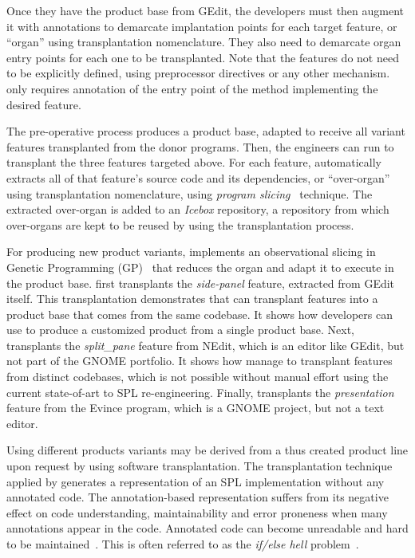 Once they have the product base from GEdit, the developers must then augment it with annotations to demarcate implantation points for each target feature, or “organ” using transplantation nomenclature. They also need to demarcate organ entry points for each one to be transplanted. Note that the features do not need to be explicitly defined, using preprocessor directives or any other mechanism. \autoscalpel only requires annotation of the entry point of the method implementing the desired feature. 

The pre-operative process produces a product base, adapted to receive all variant features transplanted from the donor programs. Then, the engineers can run \autoscalpel to transplant the three features targeted above. For each feature, \autoscalpel automatically extracts all of that feature's source code and its dependencies, or “over-organ” using transplantation nomenclature, using \emph{program slicing}~\cite{Binkley:2014:OLP:2635868.2635893} technique. The extracted over-organ is added to an \emph{Icebox} repository, a repository from which over-organs are kept to be reused by using the transplantation process.

For producing new product variants, \autoscalpel implements an observational slicing in Genetic Programming (GP)~\cite{Harman2009} that reduces the organ and adapt it to execute in the product base. \autoscalpel first transplants the \emph{side-panel} feature, extracted from GEdit itself. This transplantation demonstrates that \autoscalpel can transplant features into a product base that comes from the same codebase. It shows how developers can use \autoscalpel to produce a customized product from a single product base. Next, \autoscalpel transplants the \emph{split\_pane} feature from NEdit, which is an editor like GEdit, but not part of the GNOME portfolio. It shows how \autoscalpel manage to transplant features from distinct codebases, which is not possible without manual effort using the current state-of-art to SPL re-engineering. Finally, \autoscalpel transplants the \emph{presentation} feature from the Evince program, which is a GNOME project, but not a text editor. %

Using \FOUNDRY different products variants may be derived from a thus created product line upon request by using software transplantation. The transplantation technique applied by \FOUNDRY generates a representation of an SPL implementation without any annotated code. The annotation-based representation suffers from its negative effect on code understanding, maintainability and error proneness when many annotations appear in the code. Annotated code can become unreadable and hard to be maintained~\cite{Nicolas2021}. This is often referred to as the \emph{if/else hell} problem~\cite{Tartler2011, Aleixo2012, Medeiros2015}. %

